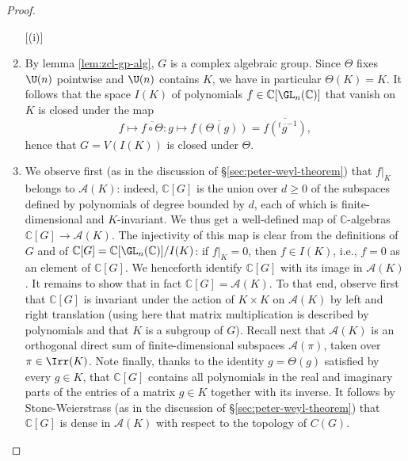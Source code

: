 \documentclass[reqno]{amsart} 
\begin{document}
\begin{proof}
  \begin{enumerate}
[(i)]
  \item By lemma \ref{lem:zcl-gp-alg}, $G$ is a complex algebraic group.  Since $\Theta$ fixes $\U(n)$ pointwise and $\U(n)$ contains $K$, we have in particular $\Theta(K) = K$.  It follows that the space $I(K)$ of polynomials $f \in \mathbb{C}[\GL_n(\mathbb{C})]$ that vanish on $K$ is closed under the map
    \begin{equation*}
      f \mapsto \overline{f \circ \Theta} : g \mapsto \overline{f(\Theta(g))} = \overline{f({}^t \overline{g}^{-1})},
    \end{equation*}
    hence that $G = V(I(K))$ is closed under $\Theta$.
  \item We observe first (as in the discussion of \S\ref{sec:peter-weyl-theorem}) that $f|_K$ belongs to $\mathcal{A}(K)$: indeed, $\mathbb{C}[G]$ is the union over $d \geq 0$ of the subspaces defined by polynomials of degree bounded by $d$, each of which is finite-dimensional and $K$-invariant.  We thus get a well-defined map of $\mathbb{C}$-algebras $\mathbb{C}[G] \rightarrow \mathcal{A}(K)$.  The injectivity of this map is clear from the definitions of $G$ and of $\mathbb{C}[G] = \mathbb{C}[\GL_n(\mathbb{C})]/I(K)$: if $f|_K = 0$, then $f \in I(K)$, i.e., $f = 0$ as an element of $\mathbb{C}[G]$.  We henceforth identify $\mathbb{C}[G]$ with its image in $\mathcal{A}(K)$.  It remains to show that in fact $\mathbb{C}[G] = \mathcal{A}(K)$.  To that end, observe first that $\mathbb{C}[G]$ is invariant under the action of $K \times K$ on $\mathcal{A}(K)$ by left and right translation (using here that matrix multiplication is described by polynomials and that $K$ is a subgroup of $G$).  Recall next that $\mathcal{A}(K)$ is an orthogonal direct sum of finite-dimensional subspaces $\mathcal{A}(\pi)$, taken over $\pi \in \Irr(K)$.  Note finally, thanks to the identity $g = \Theta(g)$ satisfied by every $g \in K$, that $\mathbb{C}[G]$ contains all polynomials in the real and imaginary parts of the entries of a matrix $g \in K$ together with its inverse.  It follows by Stone-Weierstrass (as in the discussion of \S\ref{sec:peter-weyl-theorem}) that $\mathbb{C}[G]$ is dense in $\mathcal{A}(K)$ with respect to the topology of $C(G)$.


\end{enumerate}
\end{proof}
\end{document}
